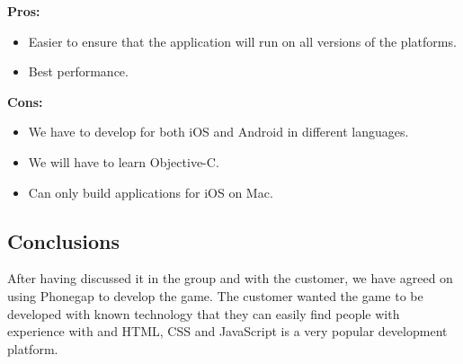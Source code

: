 \indent
  {\bf Pros:}
  \begin{itemize}
    \item Easier to ensure that the application will run on all versions of
          the platforms.
    \item Best performance.
  \end{itemize}

\indent
  {\bf Cons:}
  \begin{itemize}
    \item We have to develop for both iOS and Android in different languages.
    \item We will have to learn Objective-C.
    \item Can only build applications for iOS on Mac.
  \end{itemize}

\noindent
\subsection{Conclusions}
    After having discussed it in the group and with the customer, we have agreed
    on using Phonegap to develop the game. The customer wanted the game to
    be developed with known technology that they can easily find people with
    experience with and HTML, CSS and JavaScript is a very popular development
    platform.
